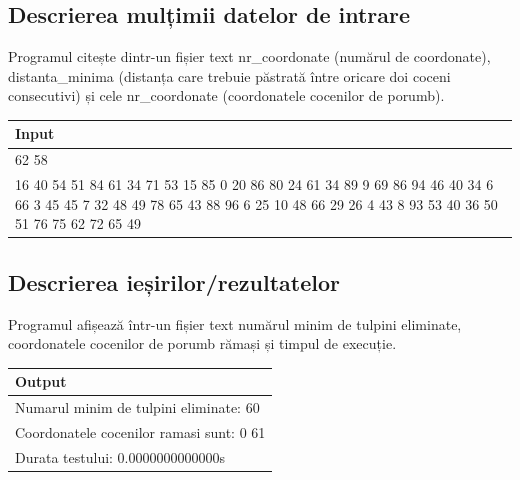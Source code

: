 \documentclass[11pt,a4paper]{article}
\begin{document}
  
\subsection{Descrierea mulțimii datelor de intrare}

    Programul citește dintr-un fișier text nr\_coordonate (numărul de coordonate), distanta\_minima (distanța care trebuie păstrată între oricare doi coceni consecutivi) și cele nr\_coordonate (coordonatele cocenilor de porumb).
    
\vspace{0.5cm}

\setlength{\arrayrulewidth}{0.7mm}
\setlength{\tabcolsep}{5pt}
\renewcommand{\arraystretch}{1}

\begin{table}[h!]
\centering
\begin{tabular}{ |p{13cm}|  }
\hline
\rowcolor{orange} \textbf{Input} \\
\hline
\rowcolor{LightCyan} 62 58 \\
\rowcolor{LightCyan} 16 40 54 51 84 61 34 71 53 15 85 0 20 86 80 24 61 34 89 9 69 86 94 46 40 34 6 66 3 45 45 7 32 48 49 78 65 43 88 96 6 25 10 48 66 29 26 4 43 8 93 53 40 36 50 51 76 75 62 72 65 49  \\
\hline
\end{tabular}
\end{table} 

\subsection{Descrierea ieșirilor/rezultatelor}

    Programul afișează într-un fișier text numărul minim de tulpini eliminate, coordonatele cocenilor de porumb rămași și timpul de execuție.
 
\setlength{\arrayrulewidth}{0.7mm}
\setlength{\tabcolsep}{5pt}
\renewcommand{\arraystretch}{1}

\begin{table}[h!]
\centering

\begin{tabular}{ |p{13cm}|  }
\hline
\rowcolor{orange} \textbf{Output} \\
\hline
\rowcolor{LightCyan} Numarul minim de tulpini eliminate: 60 \\ 
\rowcolor{LightCyan} Coordonatele cocenilor ramasi sunt: 0 61 \\
\rowcolor{LightCyan}  Durata testului: 0.0000000000000s \\
\hline
\end{tabular}
\end{table} 
    
\end{document}

